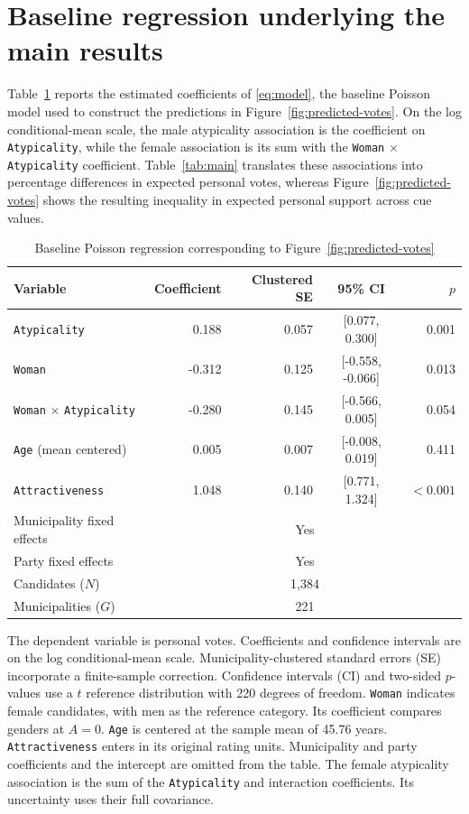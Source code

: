 \documentclass[11pt,a4paper]{article}\usepackage[]{graphicx}\usepackage[]{xcolor}
\begin{document}
\section{Baseline regression underlying the main results}
\label{sec:oa-baseline-regression}
Table~\ref{tab:oa-baseline-regression} reports the estimated coefficients of \autoref{eq:model}, the baseline Poisson model used to construct the predictions in Figure~\ref{fig:predicted-votes}. On the log conditional-mean scale, the male atypicality association is the coefficient on \texttt{Atypicality}, while the female association is its sum with the \texttt{Woman} $\times$ \texttt{Atypicality} coefficient. Table~\ref{tab:main} translates these associations into percentage differences in expected personal votes, whereas Figure~\ref{fig:predicted-votes} shows the resulting inequality in expected personal support across cue values.

\begin{table}[!htbp]
\centering\small
\caption{Baseline Poisson regression corresponding to Figure~\ref{fig:predicted-votes}}
\label{tab:oa-baseline-regression}
\begin{tabular}{@{}lrrcr@{}}
\toprule
Variable & Coefficient & Clustered SE & 95\% CI & $p$ \\
\midrule
\texttt{Atypicality} & 0.188 & 0.057 & [0.077, 0.300] & 0.001 \\
\texttt{Woman} & -0.312 & 0.125 & [-0.558, -0.066] & 0.013 \\
\texttt{Woman} $\times$ \texttt{Atypicality} & -0.280 & 0.145 & [-0.566, 0.005] & 0.054 \\
\texttt{Age} (mean centered) & 0.005 & 0.007 & [-0.008, 0.019] & 0.411 \\
\texttt{Attractiveness} & 1.048 & 0.140 & [0.771, 1.324] & $<0.001$ \\
\midrule
Municipality fixed effects & \multicolumn{4}{c}{Yes} \\
Party fixed effects & \multicolumn{4}{c}{Yes} \\
Candidates ($N$) & \multicolumn{4}{c}{1,384} \\
Municipalities ($G$) & \multicolumn{4}{c}{221} \\
\bottomrule
\end{tabular}
\par\smallskip
\begin{minipage}{\linewidth}\footnotesize
The dependent variable is personal votes. Coefficients and confidence intervals are on the log conditional-mean scale. Municipality-clustered standard errors (SE) incorporate a finite-sample correction. Confidence intervals (CI) and two-sided $p$-values use a $t$ reference distribution with 220 degrees of freedom. \texttt{Woman} indicates female candidates, with men as the reference category. Its coefficient compares genders at $A=0$. \texttt{Age} is centered at the sample mean of 45.76 years. \texttt{Attractiveness} enters in its original rating units. Municipality and party coefficients and the intercept are omitted from the table. The female atypicality association is the sum of the \texttt{Atypicality} and interaction coefficients. Its uncertainty uses their full covariance.
\end{minipage}
\end{table}
\end{document}
